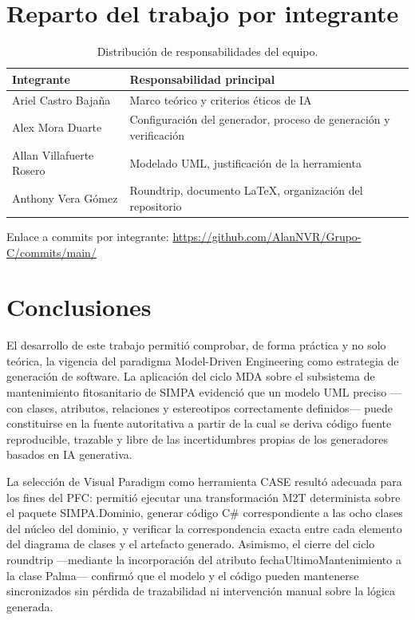 \documentclass[11pt,a4paper]{article}
\begin{document}
\section{Reparto del trabajo por integrante}

\begin{table}[H]
\centering
\caption{Distribución de responsabilidades del equipo.}
\begin{tabular}{ll}
\toprule
\textbf{Integrante} & \textbf{Responsabilidad principal} \\
\midrule
Ariel Castro Bajaña & Marco teórico y criterios éticos de IA \\
Alex Mora Duarte & Configuración del generador, proceso de generación y verificación \\
Allan Villafuerte Rosero & Modelado UML, justificación de la herramienta \\
Anthony Vera Gómez & Roundtrip, documento LaTeX, organización del repositorio \\
\bottomrule
\end{tabular}
\end{table}

Enlace a commits por integrante: \url{https://github.com/AlanNVR/Grupo-C/commits/main/}



\section{Conclusiones}
El desarrollo de este trabajo permitió comprobar, de forma práctica y no solo teórica, la vigencia del paradigma Model-Driven Engineering como estrategia de generación de software. La aplicación del ciclo MDA sobre el subsistema de mantenimiento fitosanitario de SIMPA evidenció que un modelo UML preciso —con clases, atributos, relaciones y estereotipos correctamente definidos— puede constituirse en la fuente autoritativa a partir de la cual se deriva código fuente reproducible, trazable y libre de las incertidumbres propias de los generadores basados en IA generativa.

La selección de Visual Paradigm como herramienta CASE resultó adecuada para los fines del PFC: permitió ejecutar una transformación M2T determinista sobre el paquete SIMPA.Dominio, generar código C\# correspondiente a las ocho clases del núcleo del dominio, y verificar la correspondencia exacta entre cada elemento del diagrama de clases y el artefacto generado. Asimismo, el cierre del ciclo roundtrip —mediante la incorporación del atributo fechaUltimoMantenimiento a la clase Palma— confirmó que el modelo y el código pueden mantenerse sincronizados sin pérdida de trazabilidad ni intervención manual sobre la lógica generada.
\end{document}
